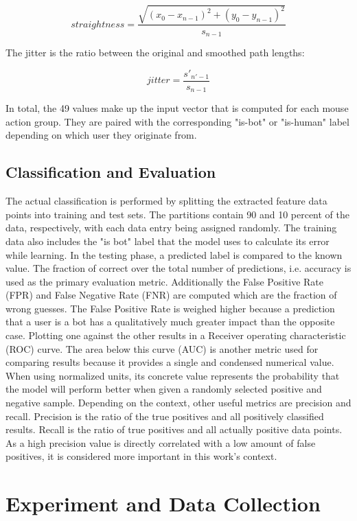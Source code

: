 \documentclass[
    fontsize=12pt,
    headings=small,
    parskip=half,           %
    bibliography=totoc,
    numbers=noenddot,       %
    open=any,               %
    final,                   %
    table
]{scrreprt}
\begin{document}
\[
straightness = \frac{ \sqrt{ (x_0 - x_{n-1})^2 + (y_0 - y_{n-1})^2 } }{s_{n-1}}
\]

The jitter is the ratio between the original and smoothed path lengths:

\[
jitter = \frac{s'_{n'-1}}{s_{n-1}}
\]

In total, the 49 values make up the input vector that is computed for each mouse action group. They are paired with the corresponding "is-bot" or "is-human" label depending on which user they originate from.


\subsection{Classification and Evaluation}

The actual classification is performed by splitting the extracted feature data points into training and test sets. The partitions contain 90 and 10 percent of the data, respectively, with each data entry being assigned randomly. The training data also includes the "is bot" label that the model uses to calculate its error while learning. In the testing phase, a predicted label is compared to the known value. The fraction of correct over the total number of predictions, i.e. accuracy is used as the primary evaluation metric. Additionally the False Positive Rate (FPR) and False Negative Rate (FNR) are computed which are the fraction of wrong guesses. The False Positive Rate is weighed higher because a prediction that a user is a bot has a qualitatively much greater impact than the opposite case. Plotting one against the other results in a Receiver operating characteristic (ROC) curve. The area below this curve (AUC) is another metric used for comparing results because it provides a single and condensed numerical value. When using normalized units, its concrete value represents the probability that the model will perform better when given a randomly selected positive and negative sample.\cite{FAWCETT2006861} Depending on the context, other useful metrics are precision and recall. Precision is the ratio of the true positives and all positively classified results. Recall is the ratio of true positives and all actually positive data points. As a high precision value is directly correlated with a low amount of false positives, it is considered more important in this work's context.

\section{Experiment and Data Collection}
\end{document}
